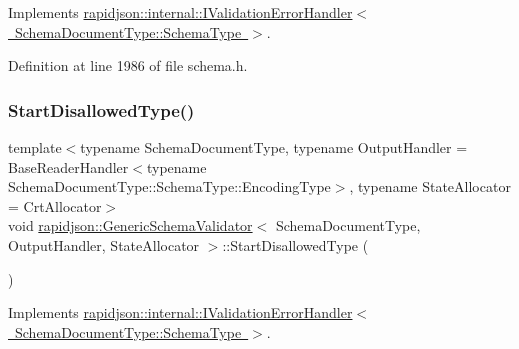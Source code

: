 Implements \mbox{\hyperlink{classrapidjson_1_1internal_1_1_i_validation_error_handler_a953298d04037e20024b69f9032a91e62}{rapidjson\+::internal\+::\+I\+Validation\+Error\+Handler$<$ Schema\+Document\+Type\+::\+Schema\+Type $>$}}.



Definition at line 1986 of file schema.\+h.


\begin{DoxyCode}{0}

\end{DoxyCode}
\mbox{\label{classrapidjson_1_1_generic_schema_validator_a6032d1e04492a898ff2134006bd9d675}} 
\subsubsection{\texorpdfstring{StartDisallowedType()}{StartDisallowedType()}}
{\footnotesize\ttfamily template$<$typename Schema\+Document\+Type, typename Output\+Handler = Base\+Reader\+Handler$<$typename Schema\+Document\+Type\+::\+Schema\+Type\+::\+Encoding\+Type$>$, typename State\+Allocator = Crt\+Allocator$>$ \\
void \mbox{\hyperlink{classrapidjson_1_1_generic_schema_validator}{rapidjson\+::\+Generic\+Schema\+Validator}}$<$ Schema\+Document\+Type, Output\+Handler, State\+Allocator $>$\+::Start\+Disallowed\+Type (\begin{DoxyParamCaption}{ }\end{DoxyParamCaption})\hspace{0.3cm}{\ttfamily [virtual]}}



Implements \mbox{\hyperlink{classrapidjson_1_1internal_1_1_i_validation_error_handler_a86596fb1c495f10fe08d598d29525ae1}{rapidjson\+::internal\+::\+I\+Validation\+Error\+Handler$<$ Schema\+Document\+Type\+::\+Schema\+Type $>$}}.



